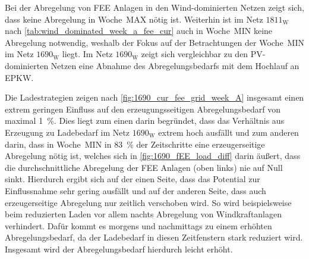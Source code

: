 

Bei der Abregelung von \gls{FEE} Anlagen in den Wind-dominierten Netzen zeigt sich, dass keine Abregelung in Woche~MAX nötig ist.
Weiterhin ist im Netz \(1811_{\text{W}}\) nach \autoref{tab:wind_dominated_week_a_fee_cur} auch in Woche~MIN keine Abregelung notwendig, weshalb der Fokus auf der Betrachtungen der Woche~MIN im Netz \(1690_{\text{W}}\) liegt.
Im Netz \(1690_{\text{W}}\) zeigt sich vergleichbar zu den \gls{PV}-dominierten Netzen eine Abnahme des Abregelungsbedarfs mit dem Hochlauf an \gls{EPKW}.\medskip

Die Ladestrategien zeigen nach \autoref{fig:1690_cur_fee_grid_week_A} insgesamt einen extrem geringen Einfluss auf den erzeugungsseitigen Abregelungsbedarf von maximal \SI{1}{\percent}.
Dies liegt zum einen darin begründet, dass das Verhältnis aus Erzeugung zu Ladebedarf im Netz \(1690_{\text{W}}\) extrem hoch ausfällt und zum anderen darin, dass in Woche~MIN in \SI{83}{\percent} der Zeitschritte eine erzeugerseitige Abregelung nötig ist, welches sich in \autoref{fig:1690_fEE_load_diff} darin äußert, dass die durchschnittliche Abregelung der \gls{FEE} Anlagen (oben links) nie auf Null sinkt.
Hierdurch ergibt sich auf der einen Seite, dass das Potential zur Einflussnahme sehr gering ausfällt und auf der anderen Seite, dass auch erzeugerseitige Abregelung nur zeitlich verschoben wird.
So wird beispielsweise beim reduzierten Laden vor allem nachts Abregelung von Windkraftanlagen verhindert.
Dafür kommt es morgens und nachmittags zu einem erhöhten Abregelungsbedarf, da der Ladebedarf in diesen Zeitfenstern stark reduziert wird.
Insgesamt wird der Abregelungsbedarf hierdurch leicht erhöht.



